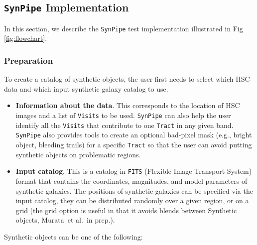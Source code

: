 \documentclass[useamsfonts]{pasj01}
\def\etal{{\ et al.~}}
\def\synpipe{\texttt{SynPipe}}
\def\tract{\texttt{Tract}}
\def\visits{\texttt{Visits}}
\begin{document}
\subsection{\synpipe{} Implementation }
    \label{ssec:flowchart}

    In this section, we describe the \synpipe{} test implementation illustrated in Fig \ref{fig:flowchart}.

\subsubsection{Preparation}
    \label{sssec:prep}

    To create a catalog of synthetic objects, the user first needs to select which HSC data and which input synthetic galaxy catalog to use. 

    \begin{itemize}

        \item \textbf{Information about the data}. This  corresponds to the location of HSC images and a list of \visits{} to be used. \synpipe{} can also help the user identify
            all the \visits{} that contribute to one \tract{} in any given
            band.
            \synpipe{} also provides tools to create an optional bad-pixel mask
            (e.g., bright object, bleeding trails) for a specific \tract{} so that
            the user can avoid putting synthetic objects on problematic regions.

        \item \textbf{Input catalog}. This is a catalog in \texttt{FITS} (Flexible Image Transport System)
            format that contains the  coordinates, magnitudes, and model parameters of synthetic  galaxies.  The positions of synthetic galaxies can be specified  via the input catalog, they can be distributed randomly over a given region, or on a grid (the grid option is useful in that it avoids blends between Synthetic objects, Murata\etal in prep.).  
    \end{itemize}

Synthetic objects can be one of the following:
\end{document}
